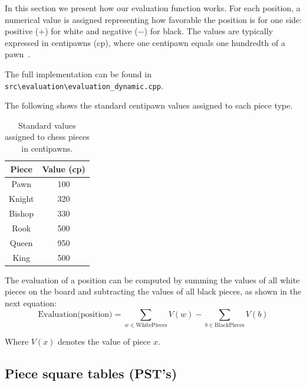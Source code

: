 In this section we present how our evaluation function works. For each position, a numerical value is assigned representing how favorable the position is for one side: positive ($+$) for white and negative ($-$) for black. The values are typically expressed in centipawns (cp), where one centipawn equals one hundredth of a pawn~\cite{Shannon1950}.

\vspace{1em}

\noindent The full implementation can be found in \\
\texttt{src\textbackslash{}evaluation\textbackslash{}evaluation\_dynamic.cpp}.

\vspace{1em}

\noindent The following shows the standard centipawn values assigned to each piece type.

\begin{table}[H]
    \centering
    \begin{tabular}{|c|c|}
        \hline
        Piece & Value (cp)\\ \hline
        Pawn & 100 \\ \hline
        Knight & 320 \\ \hline
        Bishop & 330 \\ \hline
        Rook & 500 \\ \hline
        Queen & 950 \\ \hline
        King & 500 \\ \hline
    \end{tabular}
    \caption*{Standard values assigned to chess pieces in centipawns.}\label{tab:values}
\end{table}

\noindent The evaluation of a position can be computed by summing the values of all white pieces on the board and subtracting the values of all black pieces, as shown in the next equation:
\begin{equation*}
    \text{Evaluation(position)} = \sum_{w \in \text{WhitePieces}} V(w) - \sum_{b \in \text{BlackPieces}} V(b)
\end{equation*}

\noindent Where $V(x)$ denotes the value of piece $x$.

\subsection*{Piece square tables (PST's)}

